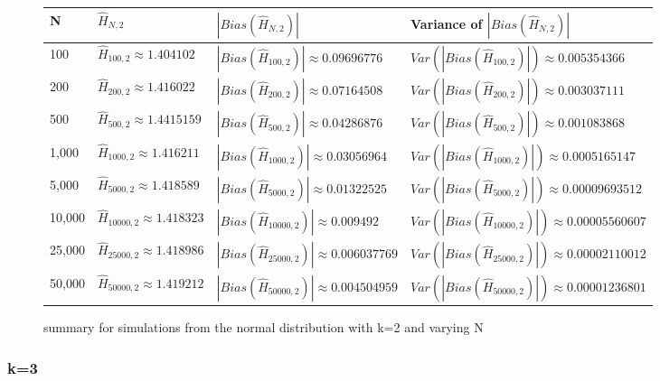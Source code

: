\documentclass{article}
\begin{document}
\begin{figure} 
 \begin{adjustwidth}{-2cm}{}
\begin{tabular}{|l|l|l|l|}
\hline
N & $\hat{H}_{N, 2}$ & $|Bias(\hat{H}_{N, 2})|$ & Variance of $|Bias(\hat{H}_{N, 2})|$ \\
\hline
100 & $\hat{H}_{100, 2} \approx 1.404102$ & $|Bias(\hat{H}_{100, 2})| \approx 0.09696776$ & $Var(|Bias(\hat{H}_{100, 2})|) \approx 0.005354366$\\
200 & $\hat{H}_{200, 2} \approx 1.416022$ & $|Bias(\hat{H}_{200, 2})| \approx 0.07164508$ & $Var(|Bias(\hat{H}_{200, 2})|) \approx 0.003037111$\\
500 & $\hat{H}_{500, 2} \approx 1.4415159$ & $|Bias(\hat{H}_{500, 2})| \approx 0.04286876$ & $Var(|Bias(\hat{H}_{500, 2})|) \approx 0.001083868$\\
1,000 & $\hat{H}_{1000, 2} \approx 1.416211$ & $|Bias(\hat{H}_{1000, 2})| \approx 0.03056964$ & $Var(|Bias(\hat{H}_{1000, 2})|) \approx 0.0005165147$\\
5,000 & $\hat{H}_{5000, 2} \approx 1.418589$ & $|Bias(\hat{H}_{5000, 2})| \approx 0.01322525$ & $Var(|Bias(\hat{H}_{5000, 2})|) \approx 0.00009693512$\\
10,000 & $\hat{H}_{10000, 2} \approx 1.418323$ & $|Bias(\hat{H}_{10000, 2})| \approx 0.009492$ & $Var(|Bias(\hat{H}_{10000, 2})|) \approx 0.00005560607$\\
25,000 & $\hat{H}_{25000, 2} \approx 1.418986$ & $|Bias(\hat{H}_{25000, 2})| \approx 0.006037769$ & $Var(|Bias(\hat{H}_{25000, 2})|) \approx 0.00002110012$\\
50,000 & $\hat{H}_{50000, 2} \approx 1.419212$ & $|Bias(\hat{H}_{50000, 2})| \approx 0.004504959$ & $Var(|Bias(\hat{H}_{50000, 2})|) \approx 0.00001236801$\\
\hline
\end{tabular}
\caption{\label{fig:normal_k=2} summary for simulations from the normal distribution with k=2 and varying N}
 \end{adjustwidth}
\end{figure}


\subsubsection{k=3}
\end{document}
